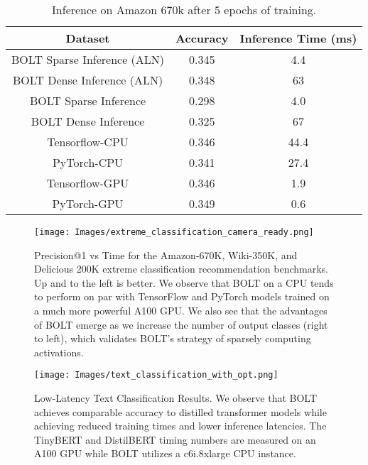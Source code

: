 \documentclass[sigconf]{acmart}
\begin{document}
\begin{table}[h]
\begin{tabular}{ |c|c|c|}
 \hline
 Dataset & Accuracy & Inference Time (ms) \\ \hline
 BOLT Sparse Inference (ALN) & 0.345 & 4.4\\ \hline
 BOLT Dense Inference (ALN) & 0.348 & 63\\ \hline
 BOLT Sparse Inference & 0.298 & 4.0\\ \hline
 BOLT Dense Inference  & 0.325 & 67\\ \hline
 Tensorflow-CPU  & 0.346 & 44.4\\ \hline
 PyTorch-CPU & 0.341 & 27.4\\ \hline
 Tensorflow-GPU & 0.346 & 1.9\\ \hline
 PyTorch-GPU & 0.349 & 0.6 \\ \hline
\end{tabular}
\caption{\label{table:sparse_inference} Inference on Amazon 670k after $5$ epochs of training.}
\vspace{-0.8cm}
\end{table}


\begin{figure*}[t]
    \texttt{[image: Images/extreme\_classification\_camera\_ready.png]}
    \vspace{-0.7cm}
    \caption{Precision@1 vs Time for the Amazon-670K, Wiki-350K, and Delicious 200K extreme classification recommendation benchmarks. Up and to the left is better. We observe that BOLT on a CPU tends to perform on par with TensorFlow and PyTorch models trained on a much more powerful A100 GPU. We also see that the advantages of BOLT emerge as we increase the number of output classes (right to left), which validates BOLT's strategy of sparsely computing activations.}
    \label{fig:extreme_classification}
\end{figure*}

\begin{figure*}[t]
    \centering
    \texttt{[image: Images/text\_classification\_with\_opt.png]}
    \vspace{-0.7cm}
    \caption{Low-Latency Text Classification Results. We observe that BOLT achieves comparable accuracy to distilled transformer models while achieving reduced training times and lower inference latencies. The TinyBERT and DistilBERT timing numbers are measured on an A100 GPU while BOLT utilizes a c6i.8xlarge CPU instance.}
    \label{fig:text_classification}
\end{figure*}
\end{document}
